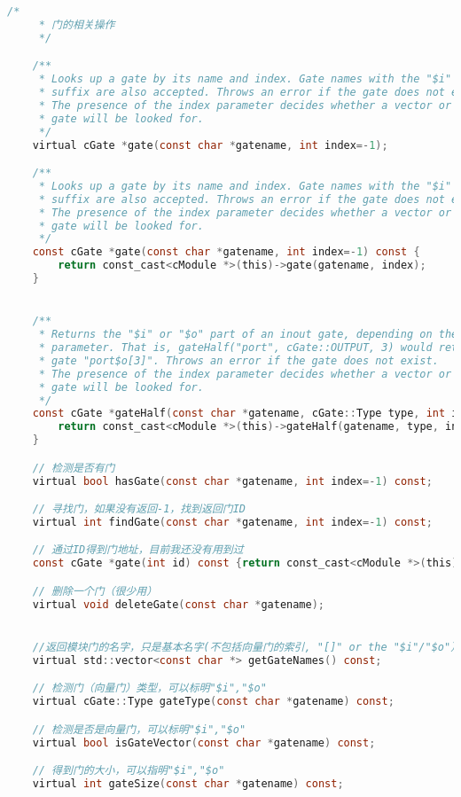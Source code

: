 \begin{lstlisting}[language=c,caption=My]
    /*
     * 门的相关操作
     */

    /**
     * Looks up a gate by its name and index. Gate names with the "$i" or "$o"
     * suffix are also accepted. Throws an error if the gate does not exist.
     * The presence of the index parameter decides whether a vector or a scalar
     * gate will be looked for.
     */
    virtual cGate *gate(const char *gatename, int index=-1);

    /**
     * Looks up a gate by its name and index. Gate names with the "$i" or "$o"
     * suffix are also accepted. Throws an error if the gate does not exist.
     * The presence of the index parameter decides whether a vector or a scalar
     * gate will be looked for.
     */
    const cGate *gate(const char *gatename, int index=-1) const {
        return const_cast<cModule *>(this)->gate(gatename, index);
    }


    /**
     * Returns the "$i" or "$o" part of an inout gate, depending on the type
     * parameter. That is, gateHalf("port", cGate::OUTPUT, 3) would return
     * gate "port$o[3]". Throws an error if the gate does not exist.
     * The presence of the index parameter decides whether a vector or a scalar
     * gate will be looked for.
     */
    const cGate *gateHalf(const char *gatename, cGate::Type type, int index=-1) const {
        return const_cast<cModule *>(this)->gateHalf(gatename, type, index);
    }

    // 检测是否有门
    virtual bool hasGate(const char *gatename, int index=-1) const;

    // 寻找门，如果没有返回-1，找到返回门ID
    virtual int findGate(const char *gatename, int index=-1) const;

    // 通过ID得到门地址，目前我还没有用到过
    const cGate *gate(int id) const {return const_cast<cModule *>(this)->gate(id);}

    // 删除一个门（很少用）
    virtual void deleteGate(const char *gatename);


    //返回模块门的名字，只是基本名字(不包括向量门的索引, "[]" or the "$i"/"$o"）
    virtual std::vector<const char *> getGateNames() const;

    // 检测门（向量门）类型，可以标明"$i","$o"
    virtual cGate::Type gateType(const char *gatename) const;

    // 检测是否是向量门，可以标明"$i","$o"
    virtual bool isGateVector(const char *gatename) const;

    // 得到门的大小，可以指明"$i","$o"
    virtual int gateSize(const char *gatename) const;


\end{lstlisting}

